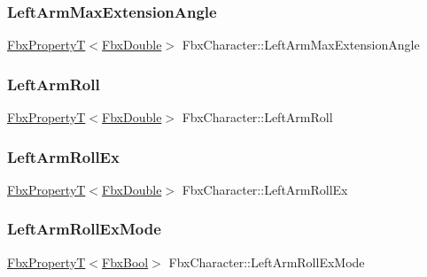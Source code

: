 \subsubsection{\texorpdfstring{Left\+Arm\+Max\+Extension\+Angle}{LeftArmMaxExtensionAngle}}
{\footnotesize\ttfamily \hyperlink{class_fbx_property_t}{Fbx\+PropertyT}$<$\hyperlink{fbxtypes_8h_a171e72a1c46fc15c1a6c9c31948c1c5b}{Fbx\+Double}$>$ Fbx\+Character\+::\+Left\+Arm\+Max\+Extension\+Angle}

\mbox{\label{class_fbx_character_a7faee1f8cc844f30b5b4cca5fc3782d7}} 
\subsubsection{\texorpdfstring{Left\+Arm\+Roll}{LeftArmRoll}}
{\footnotesize\ttfamily \hyperlink{class_fbx_property_t}{Fbx\+PropertyT}$<$\hyperlink{fbxtypes_8h_a171e72a1c46fc15c1a6c9c31948c1c5b}{Fbx\+Double}$>$ Fbx\+Character\+::\+Left\+Arm\+Roll}

\mbox{\label{class_fbx_character_a0ba6477859cfe4d8cf40ad25d0ad77f9}} 
\subsubsection{\texorpdfstring{Left\+Arm\+Roll\+Ex}{LeftArmRollEx}}
{\footnotesize\ttfamily \hyperlink{class_fbx_property_t}{Fbx\+PropertyT}$<$\hyperlink{fbxtypes_8h_a171e72a1c46fc15c1a6c9c31948c1c5b}{Fbx\+Double}$>$ Fbx\+Character\+::\+Left\+Arm\+Roll\+Ex}

\mbox{\label{class_fbx_character_a0179aa02e908bbddb1c8c3d2af572e7e}} 
\subsubsection{\texorpdfstring{Left\+Arm\+Roll\+Ex\+Mode}{LeftArmRollExMode}}
{\footnotesize\ttfamily \hyperlink{class_fbx_property_t}{Fbx\+PropertyT}$<$\hyperlink{fbxtypes_8h_a92e0562b2fe33e76a242f498b362262e}{Fbx\+Bool}$>$ Fbx\+Character\+::\+Left\+Arm\+Roll\+Ex\+Mode}

